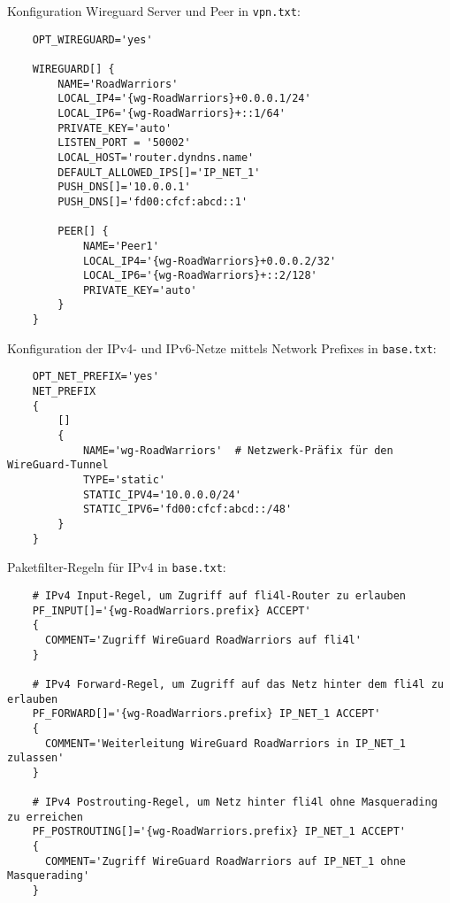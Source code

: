 Konfiguration Wireguard Server und Peer in \verb+vpn.txt+:

\begin{example}
\begin{verbatim}
    OPT_WIREGUARD='yes'

    WIREGUARD[] {
        NAME='RoadWarriors'
        LOCAL_IP4='{wg-RoadWarriors}+0.0.0.1/24'
        LOCAL_IP6='{wg-RoadWarriors}+::1/64'
        PRIVATE_KEY='auto'
        LISTEN_PORT = '50002'
        LOCAL_HOST='router.dyndns.name'
        DEFAULT_ALLOWED_IPS[]='IP_NET_1'
        PUSH_DNS[]='10.0.0.1'
        PUSH_DNS[]='fd00:cfcf:abcd::1'

        PEER[] {
            NAME='Peer1'
            LOCAL_IP4='{wg-RoadWarriors}+0.0.0.2/32'
            LOCAL_IP6='{wg-RoadWarriors}+::2/128'
            PRIVATE_KEY='auto'
        }
    }
\end{verbatim}
\end{example}


Konfiguration der IPv4- und IPv6-Netze mittels Network Prefixes in \verb+base.txt+:


\begin{example}
\begin{verbatim}
    OPT_NET_PREFIX='yes'
    NET_PREFIX
    {
        []
        {
            NAME='wg-RoadWarriors'  # Netzwerk-Präfix für den WireGuard-Tunnel
            TYPE='static'
            STATIC_IPV4='10.0.0.0/24'
            STATIC_IPV6='fd00:cfcf:abcd::/48'
        }
    }
\end{verbatim}
\end{example}


Paketfilter-Regeln für IPv4 in \verb+base.txt+:

\begin{example}
\begin{verbatim}
    # IPv4 Input-Regel, um Zugriff auf fli4l-Router zu erlauben
    PF_INPUT[]='{wg-RoadWarriors.prefix} ACCEPT'
    {
      COMMENT='Zugriff WireGuard RoadWarriors auf fli4l'
    }
    
    # IPv4 Forward-Regel, um Zugriff auf das Netz hinter dem fli4l zu erlauben
    PF_FORWARD[]='{wg-RoadWarriors.prefix} IP_NET_1 ACCEPT'
    {
      COMMENT='Weiterleitung WireGuard RoadWarriors in IP_NET_1 zulassen'
    }
    
    # IPv4 Postrouting-Regel, um Netz hinter fli4l ohne Masquerading zu erreichen
    PF_POSTROUTING[]='{wg-RoadWarriors.prefix} IP_NET_1 ACCEPT'
    {
      COMMENT='Zugriff WireGuard RoadWarriors auf IP_NET_1 ohne Masquerading'
    }

\end{verbatim}
\end{example}


